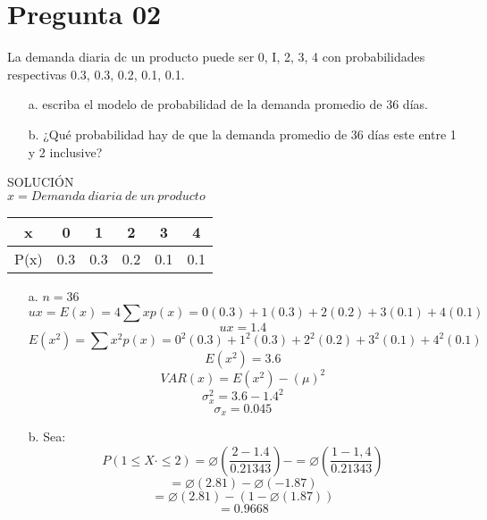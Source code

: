 \documentclass[10pt,a4paper]{article}
\begin{document}
\section{Pregunta 02}
La demanda diaria dc un producto puede ser 0, I, 2, 3, 4 con probabilidades respectivas 0.3, 0.3, 0.2, 0.1, 0.1.\\
\begin{itemize}
\item[a.]escriba el modelo de probabilidad de la demanda promedio de 36 días.
\item[b.]¿Qué probabilidad hay de que la demanda promedio de 36 días este entre 1 y 2 inclusive?\\
\end{itemize}
SOLUCIÓN\\
\newline
$ x = Demanda \ diaria \ de \ un \ producto \ $\\
\newline
\begin{tabular}{|c|c|c|c|c|c|}
\hline 
x & 0 & 1 & 2 & 3 & 4 \\ 
\hline 
P(x) & 0.3 & 0.3 & 0.2 & 0.1 & 0.1 \\ 
\hline 
\end{tabular} 
\newline
\begin{itemize}
\item[a.] $ n = 36 $ 
$$ux = E(x) = 4\sum xp(x)=0(0.3)+1(0.3)+2(0.2)+3(0.1)+4(0.1)$$
$$ux = 1.4$$
$$E(x^2) = \sum x^2p(x) = 0^2(0.3)+1^2(0.3)+2^2(0.2)+3^2(0.1)+4^2(0.1)$$
$$E(x^2)=3.6$$
$$VAR(x) = E(x^2) - (\mu)^2$$ 
$$\sigma_{x}^{2}=3.6-1.4^2$$
$$\sigma_{x} = 0.045$$
\item[b.] Sea:
$$P(1\leq X\cdot \leq2) = \varnothing(\dfrac{2-1.4}{0.21343})- = \varnothing(\dfrac{1-1,4}{0.21343})$$
$$= \varnothing(2.81) - \varnothing(-1.87)$$
$$= \varnothing(2.81) -(1-\varnothing(1.87))$$
$$= 0.9668$$
\end{itemize}
\end{document}
